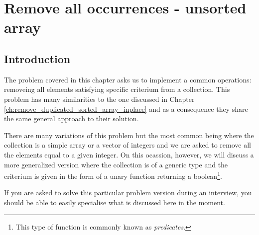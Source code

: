 %



\chapter{Remove all occurrences -  unsorted array}
\label{ch:remove_all_occurrences_unsorted_array_inplace}
\section*{Introduction}
The problem covered in this chapter asks us to implement a common operations: removeing all
elements satisfying specific criterium from a collection. This problem has many similarities to
the one discussed in Chapter \ref{ch:remove_duplicated_sorted_array_inplace} and as a consequence
they share the same general approach to their solution. 

There are many variations of this problem but the most common being  where the
collection is a simple array or a vector of integers and we are asked to remove all the elements
equal to a given integer. On this ocassion, however,  we will discuss a more generalized version where the 
collection is of a generic type  and the criterium is given in the form of a unary
function returning a boolean\footnote{This type of function is commonly known as
\textit{predicates}.}. 

If you are asked to solve this particular problem version during an interview, you should be able to easily specialise what is discussed here in the moment.


